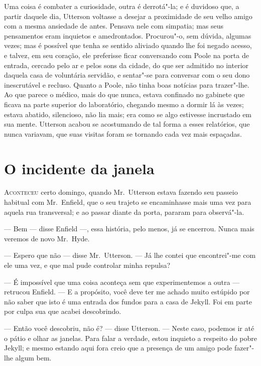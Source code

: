 Uma coisa é combater a curiosidade, outra é derrotá"-la; e é duvidoso
que, a partir daquele dia, Utterson voltasse a desejar a proximidade de
seu velho amigo com a mesma ansiedade de antes.  Pensava nele com
simpatia; mas seus pensamentos eram inquietos e amedrontados. 
Procurou"-o, sem dúvida, algumas vezes; mas é possível que tenha se
sentido aliviado quando lhe foi negado acesso, e talvez, em
seu coração, ele preferisse ficar conversando com Poole na porta de
entrada, cercado pelo ar e pelos sons da cidade, do que ser admitido no
interior daquela casa de voluntária servidão, e sentar"-se para
conversar com o seu dono inescrutável e recluso.  Quanto a Poole, não
tinha boas notícias para trazer"-lhe.  Ao que parece o médico, mais do
que nunca, estava confinado no gabinete que ficava na parte superior do
laboratório, chegando mesmo a dormir lá às vezes; estava abatido,
silencioso, não lia mais; era como se algo estivesse incrustado em
sua mente.  Utterson acabou se acostumando de tal forma a esses
relatórios, que nunca variavam, que suas visitas foram se tornando cada
vez mais espaçadas. 


\chapter[O incidente da janela]{O incidente da janela}

\textsc{Aconteceu} certo domingo, quando Mr.~Utterson estava fazendo seu passeio
habitual com Mr.~Enfield, que o seu trajeto se encaminhasse mais uma
vez para aquela rua transversal; e ao passar diante da porta, pararam
para \mbox{observá"-la}.

--- Bem --- disse Enfield ---, essa história, pelo menos, já se encerrou. 
Nunca mais veremos de novo Mr.~Hyde. 

--- Espero que não --- disse Mr.~Utterson. --- Já lhe contei que
encontrei"-me com ele uma vez, e que mal pude controlar minha repulsa?

--- É impossível que uma coisa aconteça sem que experimentemos a outra ---
retrucou Enfield. --- E a propósito, você deve ter me achado muito
estúpido por não saber que isto é uma entrada dos fundos para a casa de
Jekyll.  Foi em parte por culpa sua que acabei descobrindo.

--- Então você descobriu, não é? --- disse Utterson. --- Neste caso, podemos
ir até o pátio e olhar as janelas.  Para falar a verdade, estou
inquieto a respeito do pobre Jekyll; e mesmo estando aqui fora creio
que a presença de um amigo pode fazer"-lhe algum bem.

